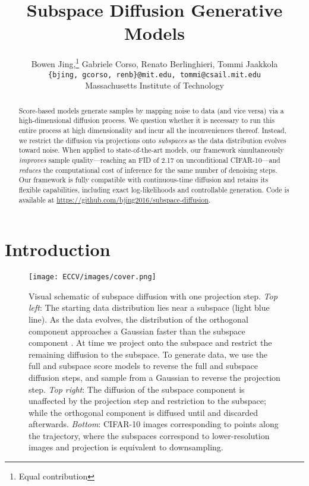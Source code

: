 \documentclass{article}
\begin{document}
\newcommand*\samethanks[1][\value{footnote}]{\footnotemark[#1]}
\title{Subspace Diffusion Generative Models}
\author{Bowen Jing,\thanks{Equal contribution} \; Gabriele Corso,\samethanks \; Renato Berlinghieri, Tommi Jaakkola \\
       {\texttt{\{bjing, gcorso, renb\}@mit.edu, tommi@csail.mit.edu}}\\
       Massachusetts Institute of Technology \\
}

\maketitle
\thispagestyle{empty}

\begin{abstract}
Score-based models generate  samples by mapping noise to data (and vice versa) via a high-dimensional diffusion process. We question whether it is necessary to run this entire process at high dimensionality and incur all the inconveniences thereof. Instead, we restrict the diffusion via projections onto \emph{subspaces} as the data distribution evolves toward noise. When applied to state-of-the-art models, our framework simultaneously \emph{improves} sample quality---reaching an FID of 2.17 on unconditional CIFAR-10---and \emph{reduces} the computational cost of inference for the same number of denoising steps. Our framework is fully compatible with continuous-time diffusion and retains its flexible capabilities, including exact log-likelihoods and controllable generation. Code is available at \url{https://github.com/bjing2016/subspace-diffusion}.
\end{abstract}


\section{Introduction} \label{sec:intro}

\begin{figure}[t]
    \centering
    \texttt{[image: ECCV/images/cover.png]}
    \caption{Visual schematic of subspace diffusion with one projection step. \emph{Top left}: The starting data distribution  lies near a subspace (light blue line). As the data evolves, the distribution of the orthogonal component  approaches a Gaussian faster than the subspace component . At time  we project onto the subspace and restrict the remaining diffusion to the subspace. To generate data, we use the full and subspace score models to reverse the full and subspace diffusion steps, and sample  from a Gaussian to reverse the projection step. \emph{Top right}: The diffusion of the subspace component  is unaffected by the projection step and restriction to the subspace; while the orthogonal component is diffused until  and discarded afterwards. \emph{Bottom}: CIFAR-10 images corresponding to points along the trajectory, where the subspaces correspond to lower-resolution images and projection is equivalent to downsampling.}
    \label{fig:method}
\end{figure}
\end{document}
